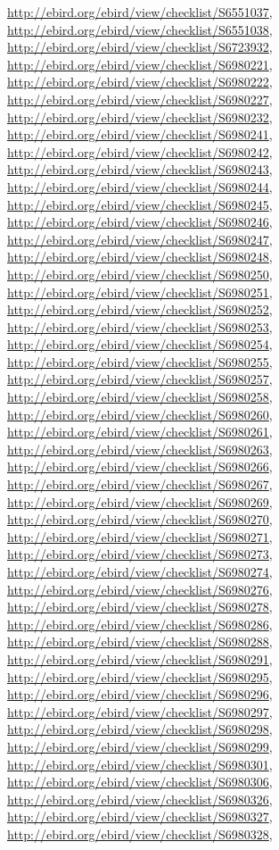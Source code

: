 \documentclass[9pt, article]{memoir}
\begin{document}
\begin{multicols}{2}
\url{http://ebird.org/ebird/view/checklist/S6551037}, 
\url{http://ebird.org/ebird/view/checklist/S6551038}, 
\url{http://ebird.org/ebird/view/checklist/S6723932}, 
\url{http://ebird.org/ebird/view/checklist/S6980221}, 
\url{http://ebird.org/ebird/view/checklist/S6980222}, 
\url{http://ebird.org/ebird/view/checklist/S6980227}, 
\url{http://ebird.org/ebird/view/checklist/S6980232}, 
\url{http://ebird.org/ebird/view/checklist/S6980241}, 
\url{http://ebird.org/ebird/view/checklist/S6980242}, 
\url{http://ebird.org/ebird/view/checklist/S6980243}, 
\url{http://ebird.org/ebird/view/checklist/S6980244}, 
\url{http://ebird.org/ebird/view/checklist/S6980245}, 
\url{http://ebird.org/ebird/view/checklist/S6980246}, 
\url{http://ebird.org/ebird/view/checklist/S6980247}, 
\url{http://ebird.org/ebird/view/checklist/S6980248}, 
\url{http://ebird.org/ebird/view/checklist/S6980250}, 
\url{http://ebird.org/ebird/view/checklist/S6980251}, 
\url{http://ebird.org/ebird/view/checklist/S6980252}, 
\url{http://ebird.org/ebird/view/checklist/S6980253}, 
\url{http://ebird.org/ebird/view/checklist/S6980254}, 
\url{http://ebird.org/ebird/view/checklist/S6980255}, 
\url{http://ebird.org/ebird/view/checklist/S6980257}, 
\url{http://ebird.org/ebird/view/checklist/S6980258}, 
\url{http://ebird.org/ebird/view/checklist/S6980260}, 
\url{http://ebird.org/ebird/view/checklist/S6980261}, 
\url{http://ebird.org/ebird/view/checklist/S6980263}, 
\url{http://ebird.org/ebird/view/checklist/S6980266}, 
\url{http://ebird.org/ebird/view/checklist/S6980267}, 
\url{http://ebird.org/ebird/view/checklist/S6980269}, 
\url{http://ebird.org/ebird/view/checklist/S6980270}, 
\url{http://ebird.org/ebird/view/checklist/S6980271}, 
\url{http://ebird.org/ebird/view/checklist/S6980273}, 
\url{http://ebird.org/ebird/view/checklist/S6980274}, 
\url{http://ebird.org/ebird/view/checklist/S6980276}, 
\url{http://ebird.org/ebird/view/checklist/S6980278}, 
\url{http://ebird.org/ebird/view/checklist/S6980286}, 
\url{http://ebird.org/ebird/view/checklist/S6980288}, 
\url{http://ebird.org/ebird/view/checklist/S6980291}, 
\url{http://ebird.org/ebird/view/checklist/S6980295}, 
\url{http://ebird.org/ebird/view/checklist/S6980296}, 
\url{http://ebird.org/ebird/view/checklist/S6980297}, 
\url{http://ebird.org/ebird/view/checklist/S6980298}, 
\url{http://ebird.org/ebird/view/checklist/S6980299}, 
\url{http://ebird.org/ebird/view/checklist/S6980301}, 
\url{http://ebird.org/ebird/view/checklist/S6980306}, 
\url{http://ebird.org/ebird/view/checklist/S6980326}, 
\url{http://ebird.org/ebird/view/checklist/S6980327}, 
\url{http://ebird.org/ebird/view/checklist/S6980328}, 

\end{multicols}
\end{document}
